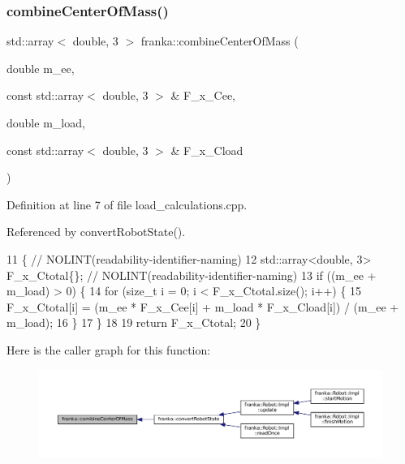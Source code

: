\subsubsection{\texorpdfstring{combine\+Center\+Of\+Mass()}{combineCenterOfMass()}}
{\footnotesize\ttfamily std\+::array$<$ double, 3 $>$ franka\+::combine\+Center\+Of\+Mass (\begin{DoxyParamCaption}\item[{double}]{m\+\_\+ee,  }\item[{const std\+::array$<$ double, 3 $>$ \&}]{F\+\_\+x\+\_\+\+Cee,  }\item[{double}]{m\+\_\+load,  }\item[{const std\+::array$<$ double, 3 $>$ \&}]{F\+\_\+x\+\_\+\+Cload }\end{DoxyParamCaption})}



Definition at line 7 of file load\+\_\+calculations.\+cpp.



Referenced by convert\+Robot\+State().


\begin{DoxyCode}
11                                           \{  \textcolor{comment}{// NOLINT(readability-identifier-naming)}
12   std::array<double, 3> F\_x\_Ctotal\{\};          \textcolor{comment}{// NOLINT(readability-identifier-naming)}
13   \textcolor{keywordflow}{if} ((m\_ee + m\_load) > 0) \{
14     \textcolor{keywordflow}{for} (\textcolor{keywordtype}{size\_t} i = 0; i < F\_x\_Ctotal.size(); i++) \{
15       F\_x\_Ctotal[i] = (m\_ee * F\_x\_Cee[i] + m\_load * F\_x\_Cload[i]) / (m\_ee + m\_load);
16     \}
17   \}
18 
19   \textcolor{keywordflow}{return} F\_x\_Ctotal;
20 \}
\end{DoxyCode}
Here is the caller graph for this function\+:
\nopagebreak
\begin{figure}[H]
\begin{center}
\leavevmode
\includegraphics[width=350pt]{namespacefranka_a92a802942d91aff279534b952468dc51_icgraph}
\end{center}
\end{figure}
\mbox{\label{namespacefranka_a4be229abc6da1b78167353e5448ea1d5}} 
